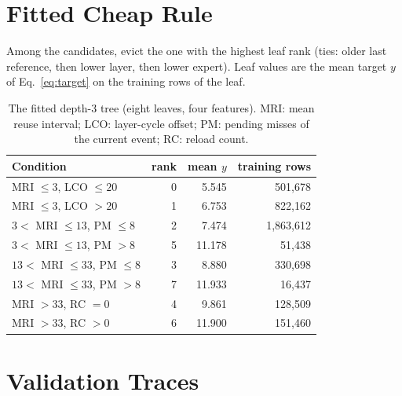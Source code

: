 \documentclass[11pt]{article}
\theoremstyle{plain}
\theoremstyle{definition}
\begin{document}
\section{Fitted Cheap Rule}
\label{app:rule}
Among the candidates, evict the one with the highest leaf rank (ties: older last reference, then lower layer, then lower expert). Leaf values are the mean target $y$ of Eq.~\eqref{eq:target} on the training rows of the leaf.
\begin{table}[h]
\centering
\caption{The fitted depth-3 tree (eight leaves, four features). MRI: mean reuse interval; LCO: layer-cycle offset; PM: pending misses of the current event; RC: reload count.}
\label{tab:rule}
\small
\begin{tabular}{lrrr}
\toprule
Condition & rank & mean $y$ & training rows \\
\midrule
MRI $\le 3$, LCO $\le 20$ & 0 & 5.545 & 501{,}678 \\
MRI $\le 3$, LCO $> 20$ & 1 & 6.753 & 822{,}162 \\
$3 <$ MRI $\le 13$, PM $\le 8$ & 2 & 7.474 & 1{,}863{,}612 \\
$3 <$ MRI $\le 13$, PM $> 8$ & 5 & 11.178 & 51{,}438 \\
$13 <$ MRI $\le 33$, PM $\le 8$ & 3 & 8.880 & 330{,}698 \\
$13 <$ MRI $\le 33$, PM $> 8$ & 7 & 11.933 & 16{,}437 \\
MRI $> 33$, RC $= 0$ & 4 & 9.861 & 128{,}509 \\
MRI $> 33$, RC $> 0$ & 6 & 11.900 & 151{,}460 \\
\bottomrule
\end{tabular}
\end{table}

\clearpage
\section{Validation Traces}
\label{app:val}

\end{document}
